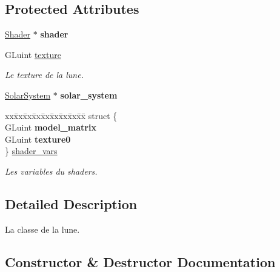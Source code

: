 \subsection*{Protected Attributes}
\begin{DoxyCompactItemize}
\item 
\mbox{\label{classMoon_abfe307cf8462e30b000d773cf7f94618}} 
\mbox{\hyperlink{classShader}{Shader}} $\ast$ {\bfseries shader}
\item 
\mbox{\label{classMoon_a1a3b6d9e9747e1d76f0fcb17c3e948d0}} 
G\+Luint \mbox{\hyperlink{classMoon_a1a3b6d9e9747e1d76f0fcb17c3e948d0}{texture}}
\begin{DoxyCompactList}\small\item\em Le texture de la lune. \end{DoxyCompactList}\item 
\mbox{\label{classMoon_ad9449fa2c517f2641e2720d4b95c5be7}} 
\mbox{\hyperlink{classSolarSystem}{Solar\+System}} $\ast$ {\bfseries solar\+\_\+system}
\item 
\mbox{\label{classMoon_a767c6d8f7d773730e54ed08929a4e037}} 
\begin{tabbing}
xx\=xx\=xx\=xx\=xx\=xx\=xx\=xx\=xx\=\kill
struct \{\\
\>GLuint {\bfseries model\_matrix}\\
\>GLuint {\bfseries texture0}\\
\} \mbox{\hyperlink{classMoon_a767c6d8f7d773730e54ed08929a4e037}{shader\_vars}}\\

\end{tabbing}\begin{DoxyCompactList}\small\item\em Les variables du shaders. \end{DoxyCompactList}\end{DoxyCompactItemize}


\subsection{Detailed Description}
La classe de la lune. 



\subsection{Constructor \& Destructor Documentation}
\mbox{\label{classMoon_aabd6f46efd4751b9bcf8db3e93c92a44}} 
